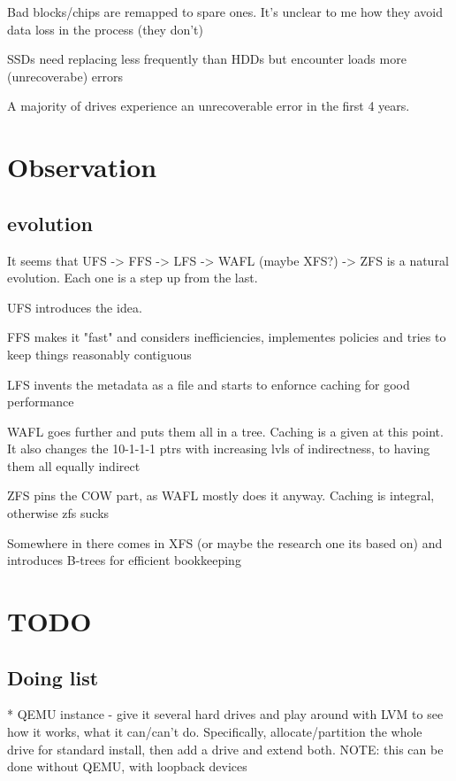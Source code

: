 \documentclass[a4paper]{article}
\begin{document}
        Bad blocks/chips are remapped to spare ones. It's unclear to me how
        they avoid data loss in the process (they don't)

        SSDs need replacing less frequently than HDDs but encounter loads more
        (unrecoverabe) errors

        A majority of drives experience an unrecoverable error in the first 4
        years.

\section{Observation}
    \subsection{evolution}

        It seems that UFS -> FFS -> LFS -> WAFL (maybe XFS?) -> ZFS is a
        natural evolution. Each one is a step up from the last.

        UFS introduces the idea.

        FFS makes it "fast" and considers inefficiencies, implementes policies
        and tries to keep things reasonably contiguous

        LFS invents the metadata as a file and starts to enfornce caching for
        good performance

        WAFL goes further and puts them all in a tree. Caching is a given at
        this point. It also changes the 10-1-1-1 ptrs with increasing lvls of
        indirectness, to having them all equally indirect

        ZFS pins the COW part, as WAFL mostly does it anyway. Caching is
        integral, otherwise zfs sucks

        Somewhere in there comes in XFS (or maybe the research one its based
        on) and introduces B-trees for efficient bookkeeping


\section{TODO}

    \subsection{Doing list}
        * QEMU instance
            - give it several hard drives and play around with LVM to see how
            it works, what it can/can't do. Specifically, allocate/partition
            the whole drive for standard install, then add a drive and extend
            both. NOTE: this can be done without QEMU, with loopback devices
\end{document}
